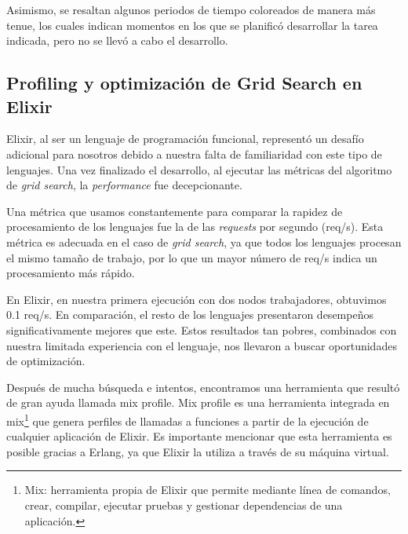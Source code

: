 \documentclass[11pt]{article}
\let\Oldsubsection\subsection
\renewcommand{\subsection}{\FloatBarrier\Oldsubsection}
\newcommand{\english}[1]{\textit{#1}}
\begin{document}
Asimismo, se resaltan algunos periodos de tiempo coloreados de manera más tenue, los cuales indican momentos en los que se planificó desarrollar la tarea indicada, pero no se llevó a cabo el desarrollo.

\subsection{Profiling y optimización de Grid Search en Elixir} \label{sec:anex:elixir_gs_optimization}


Elixir, al ser un lenguaje de programación funcional, representó un desafío adicional para nosotros debido a nuestra falta de familiaridad con este tipo de lenguajes. Una vez finalizado el desarrollo, al ejecutar las métricas del algoritmo de \english{grid search}, la \english{performance} fue decepcionante.

Una métrica que usamos constantemente para comparar la rapidez de procesamiento de los lenguajes fue la de las \english{requests} por segundo (req/s). Esta métrica es adecuada en el caso de \english{grid search}, ya que todos los lenguajes procesan el mismo tamaño de trabajo, por lo que un mayor número de req/s indica un procesamiento más rápido.

En Elixir, en nuestra primera ejecución con dos nodos trabajadores, obtuvimos 0.1 req/s. En comparación, el resto de los lenguajes presentaron desempeños significativamente mejores que este. Estos resultados tan pobres, combinados con nuestra limitada experiencia con el lenguaje, nos llevaron a buscar oportunidades de optimización.

Después de mucha búsqueda e intentos, encontramos una herramienta que resultó de gran ayuda llamada mix profile. Mix profile es una herramienta integrada en mix\footnote{Mix: herramienta propia de Elixir que permite mediante línea de comandos, crear, compilar, ejecutar pruebas y gestionar dependencias de una aplicación.} que genera perfiles de llamadas a funciones a partir de la ejecución de cualquier aplicación de Elixir. Es importante mencionar que esta herramienta es posible gracias a Erlang, ya que Elixir la utiliza a través de su máquina virtual.
\end{document}
